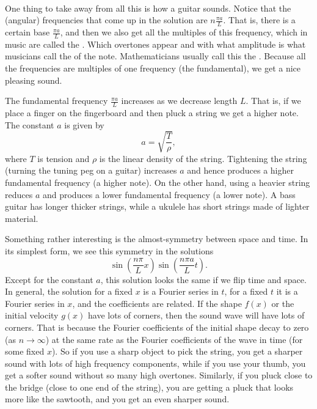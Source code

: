 \begin{example}
\begin{myfig}
\capstart
\\[5pt]
\caption{Plucked string for $t=0$, $t=0.4$, $t=0.8$, and
$t=1.2$.%
\label{wave:pluckedtsfig}}
\end{myfig}
\end{example}

One thing to take away from all this is how a guitar sounds.  Notice that
the (angular) frequencies that come up in the solution are
$n \frac{\pi a}{L}$.  That is, there is a certain base
\emph{} $\frac{\pi a}{L}$, and then we also
get all the multiples of this frequency, which in music are called
the \emph{}.  Which overtones appear and with what amplitude
is what musicians call the \emph{} of the note.
Mathematicians usually call this the \emph{}.
Because all the frequencies are multiples of one frequency (the
fundamental),
we get a nice pleasing sound.

The fundamental frequency $\frac{\pi a}{L}$ increases as we decrease length $L$.  That is, if
we place a finger on the fingerboard and then pluck a string we get a higher
note.  The constant $a$ is given by
\begin{equation*}
a = \sqrt{\frac{T}{\rho}} ,
\end{equation*}
where $T$ is tension and $\rho$ is the linear density of the string.
Tightening the string (turning the tuning peg on a guitar) increases $a$ and
hence produces a higher fundamental frequency (a higher note).
On the other hand, using a heavier string 
reduces $a$ and produces a lower fundamental frequency (a lower note).
A bass guitar has longer thicker strings, while a ukulele has short strings
made of lighter material.

Something rather interesting is the almost-symmetry between space and time.
In its simplest form, we see this symmetry in the solutions
\begin{equation*}
\sin \left( \frac{n \pi}{L} x \right)
\sin \left( \frac{n \pi a}{L} t \right)  .
\end{equation*}
Except for the constant $a$, this solution looks the same if we
flip time and space.
In general, the solution for a fixed $x$ is a Fourier series in $t$, for
a fixed $t$ it is a Fourier series in $x$, and the coefficients are related.
If the shape $f(x)$ or the initial velocity $g(x)$ have lots of corners, then
the sound wave will have lots of corners.  That is because the Fourier coefficients
of the initial shape decay to zero (as $n \to \infty$) at the same rate as the Fourier coefficients
of the wave in time (for some fixed $x$).  So if you use a sharp object to
pick the string, you get a sharper sound with lots of high frequency
components, while if you use your thumb, you get a softer sound without
so many high overtones.
Similarly, if you pluck close to the bridge (close
to one end of the string), you are
getting a pluck that looks more like the sawtooth, and you get an even
sharper sound.

